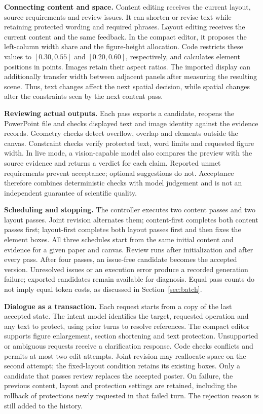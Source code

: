 \documentclass{article}
\begin{document}
\textbf{Connecting content and space.} Content editing receives the current layout, source requirements and review issues. It can shorten or revise text while retaining protected wording and required phrases. Layout editing receives the current content and the same feedback. In the compact editor, it proposes the left-column width share and the figure-height allocation. Code restricts these values to $[0.30,0.55]$ and $[0.20,0.60]$, respectively, and calculates element positions in points. Images retain their aspect ratios. The imported display can additionally transfer width between adjacent panels after measuring the resulting scene. Thus, text changes affect the next spatial decision, while spatial changes alter the constraints seen by the next content pass.

\textbf{Reviewing actual outputs.} Each pass exports a candidate, reopens the PowerPoint file and checks displayed text and image identity against the evidence records. Geometry checks detect overflow, overlap and elements outside the canvas. Constraint checks verify protected text, word limits and requested figure width. In live mode, a vision-capable model also compares the preview with the source evidence and returns a verdict for each claim. Reported unmet requirements prevent acceptance; optional suggestions do not. Acceptance therefore combines deterministic checks with model judgement and is not an independent guarantee of scientific quality.

\textbf{Scheduling and stopping.} The controller executes two content passes and two layout passes. Joint revision alternates them; content-first completes both content passes first; layout-first completes both layout passes first and then fixes the element boxes. All three schedules start from the same initial content and evidence for a given paper and canvas. Review runs after initialization and after every pass. After four passes, an issue-free candidate becomes the accepted version. Unresolved issues or an execution error produce a recorded generation failure; exported candidates remain available for diagnosis. Equal pass counts do not imply equal token costs, as discussed in Section~\ref{sec:batch}.

\textbf{Dialogue as a transaction.} Each request starts from a copy of the last accepted state. The intent model identifies the target, requested operation and any text to protect, using prior turns to resolve references. The compact editor supports figure enlargement, section shortening and text protection. Unsupported or ambiguous requests receive a clarification response. Code checks conflicts and permits at most two edit attempts. Joint revision may reallocate space on the second attempt; the fixed-layout condition retains its existing boxes. Only a candidate that passes review replaces the accepted poster. On failure, the previous content, layout and protection settings are retained, including the rollback of protections newly requested in that failed turn. The rejection reason is still added to the history.
\end{document}
